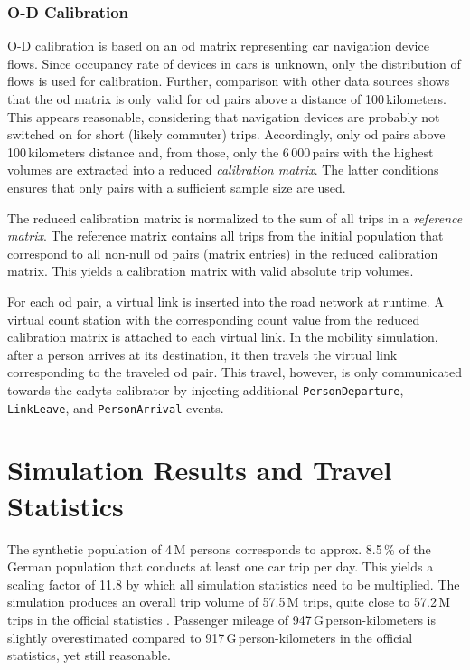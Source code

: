 \subsubsection{O-D Calibration}

O-D calibration is based on an \gls{od} matrix representing car navigation device flows. Since occupancy rate of devices in cars is unknown, only the distribution of flows is used for calibration. Further, comparison with other data sources shows that the \gls{od} matrix is only valid for \gls{od} pairs above a distance of 100\,kilometers. This appears reasonable, considering that navigation devices are probably not switched on for short (likely commuter) trips. Accordingly, only \gls{od} pairs above 100\,kilometers distance and, from those, only the 6\,000\,pairs with the highest volumes are extracted into a reduced \emph{calibration matrix}. The latter conditions ensures that only pairs with a sufficient sample size are used.

The reduced calibration matrix is normalized to the sum of all trips in a \emph{reference matrix}. The reference matrix contains all trips from the initial population that correspond to all non-null \gls{od} pairs (matrix entries) in the reduced calibration matrix. This yields a calibration matrix with valid absolute trip volumes.

For each \gls{od} pair, a virtual link is inserted into the road network at runtime. A virtual count station with the corresponding count value from the reduced calibration matrix is attached to each virtual link. In the mobility simulation, after a person arrives at its destination, it then travels the virtual link corresponding to the traveled \gls{od} pair. This travel, however, is only communicated towards the \gls{cadyts} calibrator by injecting additional \lstinline|PersonDeparture|, \lstinline|LinkLeave|, and \lstinline|PersonArrival| events.

\section{Simulation Results and Travel Statistics}

The synthetic population of 4\,M persons corresponds to approx. 8.5\,\% of the German population that conducts at least one car trip per day. This yields a scaling factor of 11.8 by which all simulation statistics need to be multiplied. The simulation produces an overall trip volume of 57.5\,M trips, quite close to 57.2\,M trips in the official statistics \citep{DIW2014VerkehrInZahlen}. Passenger mileage of 947\,G\,person-kilometers is slightly overestimated compared to 917\,G\,person-kilometers in the official statistics, yet still reasonable.

